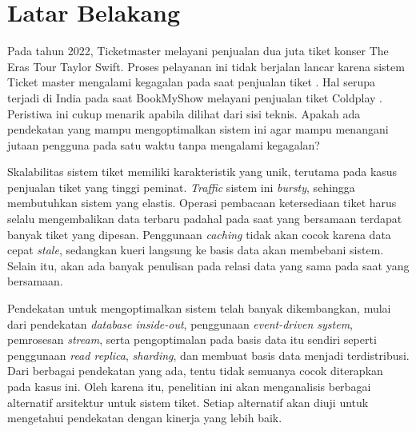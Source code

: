 \section{Latar Belakang}
\label{sec:latar-belakang}

Pada tahun 2022, Ticketmaster melayani penjualan dua juta tiket konser The Eras Tour Taylor Swift. Proses pelayanan ini tidak berjalan lancar karena sistem Ticket master mengalami kegagalan pada saat penjualan tiket \parencite{swiftTicketmaster}. Hal serupa terjadi di India pada saat BookMyShow melayani penjualan tiket Coldplay \parencite{coldplayBookMyShow}. Peristiwa ini cukup menarik apabila dilihat dari sisi teknis. Apakah ada pendekatan yang mampu mengoptimalkan sistem ini agar mampu menangani jutaan pengguna pada satu waktu tanpa mengalami kegagalan?

Skalabilitas sistem tiket memiliki karakteristik yang unik, terutama pada kasus penjualan tiket yang tinggi peminat. \textit{Traffic} sistem ini \textit{bursty}, sehingga membutuhkan sistem yang elastis. Operasi pembacaan ketersediaan tiket harus selalu mengembalikan data terbaru padahal pada saat yang bersamaan terdapat banyak tiket yang dipesan. Penggunaan \textit{caching} tidak akan cocok karena data cepat \textit{stale}, sedangkan kueri langsung ke basis data akan membebani sistem. Selain itu, akan ada banyak penulisan pada relasi data yang sama pada saat yang bersamaan.

Pendekatan untuk mengoptimalkan sistem telah banyak dikembangkan, mulai dari pendekatan \textit{database inside-out}, penggunaan \textit{event-driven system}, pemrosesan \textit{stream}, serta pengoptimalan pada basis data itu sendiri seperti penggunaan \textit{read replica}, \textit{sharding}, dan membuat basis data menjadi terdistribusi. Dari berbagai pendekatan yang ada, tentu tidak semuanya cocok diterapkan pada kasus ini. Oleh karena itu, penelitian ini akan menganalisis berbagai alternatif arsitektur untuk sistem tiket. Setiap alternatif akan diuji untuk mengetahui pendekatan dengan kinerja yang lebih baik.